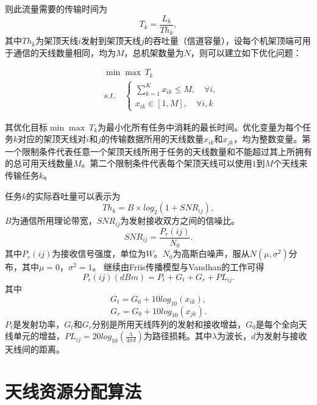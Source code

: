 则此流量需要的传输时间为
\begin{equation}
T_{k} = \frac{L_{k}}{Th_{k}},
\end{equation}
其中$Th_{k}$为架顶天线$i$发射到架顶天线$j$的吞吐量（信道容量），设每个机架顶端可用于通信的天线数量相同，均为$M$，总机架数量为$N$，则可以建立如下优化问题：

\begin{equation}\label{eq:4.1}
\begin{split}
&\min \max\, T_{k} \\
&s.t.\quad  \left\{\begin{array}{l}
\sum\limits_{k=1}^{K} x_{ik}\leq M,\quad \forall i,\\
x_{ik}\in[1,M], \quad  \forall i,k\end{array}\right.
\end{split}
\end{equation}

其优化目标$\min \max\ T_{k}$为最小化所有任务中消耗的最长时间。优化变量为每个任务$k$对应的架顶天线对$i$和$j$的传输数据所用的天线数量$x_{ik}$和$x_{jk}$，均为整数变量。第一个限制条件代表任意一个架顶天线所用于任务的天线数量和不能超过其上所拥有的总可用天线数量$M$。第二个限制条件代表每个架顶天线可以使用$1$到$M$个天线来传输任务$k$。

任务$k$的实际吞吐量可以表示为
\begin{equation}
Th_{k}=B\times log_2(1+SNR_{ij}),
\end{equation}
$B$为通信所用理论带宽，$SNR_{ij}$为发射接收双方之间的信噪比。
\begin{equation}
SNR_{ij}=\frac{P_r(ij)}{N_0}.
\end{equation}
其中$P_r(ij)$为接收信号强度，单位为$W$。$N_0$为高斯白噪声，服从$N(\mu,\sigma^2)$分布，其中$\mu = 0$，$\sigma^2=1$。
继续由Friis传播模型与Vandhan的工作\cite{vardhan2014polycell}可得
\begin{equation}
	P_{r}(ij)(dBm)=P_t+G_t+G_r+PL_{ij}.
\end{equation}
其中
\begin{equation}
	G_t = G_0+10log_{10}(x_{ik}),
\end{equation}
\begin{equation}
	G_r = G_0+10log_{10}(x_{jk}).
\end{equation}
$P_t$是发射功率，$G_t$和$G_r$分别是所用天线阵列的发射和接收增益，$G_0$是每个全向天线单元的增益，$PL_{ij} = 20log_{10}(\frac{\lambda}{4\pi d})$为路径损耗。其中$\lambda$为波长，$d$为发射与接收天线间的距离。

\section{天线资源分配算法}

